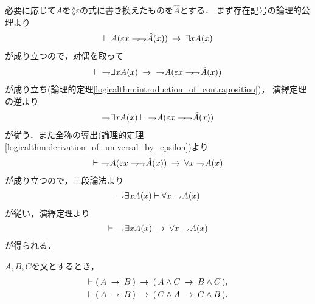	\begin{sketch}
		必要に応じて$A$を$\lang{\varepsilon}$の式に書き換えたものを$\hat{A}$とする．
		まず存在記号の論理的公理より
		\begin{align}
			\vdash A(\varepsilon x \negation \negation \hat{A}(x))
			\rarrow \exists x A(x)
		\end{align}
		が成り立つので，対偶を取って
		\begin{align}
			\vdash\ \negation \exists x A(x) 
			\rarrow\ \negation A(\varepsilon x \negation \negation \hat{A}(x))
		\end{align}
		が成り立ち(論理的定理\ref{logicalthm:introduction_of_contraposition})，
		演繹定理の逆より
		\begin{align}
			\negation \exists x A(x) \vdash\ \negation A(\varepsilon x \negation \negation \hat{A}(x))
		\end{align}
		が従う．また全称の導出(論理的定理\ref{logicalthm:derivation_of_universal_by_epsilon})より
		\begin{align}
			\vdash\ \negation A(\varepsilon x \negation \negation \hat{A}(x))
			\rarrow \forall x \negation A(x)
		\end{align}
		が成り立つので，三段論法より
		\begin{align}
			\negation \exists x A(x) \vdash \forall x \negation A(x)
		\end{align}
		が従い，演繹定理より
		\begin{align}
			\vdash\ \negation \exists x A(x) \rarrow \forall x \negation A(x)
		\end{align}
		が得られる．
		\QED
	\end{sketch}
	
	\begin{screen}
		\begin{logicalthm}[含意の論理積への遺伝性]
		\label{logicalthm:heredity_of_implication_to_conjunction}
			$A,B,C$を文とするとき，
			\begin{align}
				\vdash (\, A \rarrow B\, ) \rarrow (\, A \wedge C 
				\rarrow B \wedge C\, ), \\
				\vdash (\, A \rarrow B\, ) \rarrow (\, C \wedge A 
				\rarrow C \wedge B\, ).
			\end{align}
		\end{logicalthm}
	\end{screen}
	
